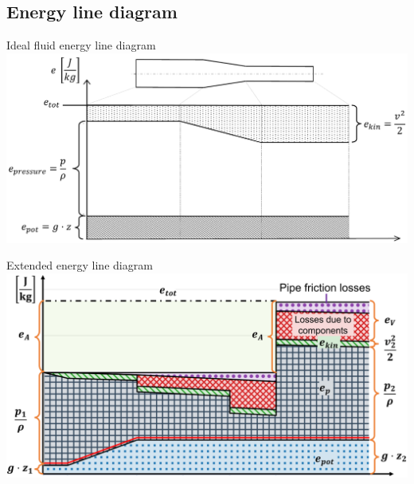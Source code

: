 \documentclass{article}
\begin{document}
\begin{multicols}{2}
\subsection{Energy line diagram}
\begin{theorybox}{Ideal fluid energy line diagram}
    \includegraphics[width=\textwidth]{media/EGL_Duese_EN.PNG}
\end{theorybox}

\begin{theorybox}{Extended energy line diagram}
    \includegraphics[width=\textwidth]{media/04_energyLineDiagram_vGB.png}
\end{theorybox}

\vfill
\end{multicols}
\end{document}
